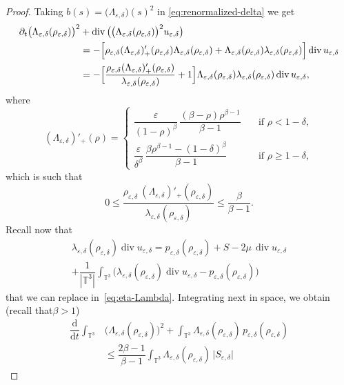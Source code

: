 \documentclass[JEP,XML,SOM,Unicode,NoEqCountersInSection]{cedram}
\newcommand{\<}{\bigl\langle}
\renewcommand{\>}{\bigr\rangle}
\newcommand{\labeleq}[1]{}
\theoremstyle{definition}
\theoremstyle{remark}
\newcommand{\TT}{\mathbb{T}^3}
\DeclareMathOperator{\Div}{div}
\newcommand{\Dt}{\dfrac{\mathrm{d}}{\mathrm{d} t}}
\let\ep\varepsilon
\begin{document}
\begin{proof}
Taking $b(s) = \big(\Lambda_{\ep,\delta}\big)(s)^2$ in \eqref{eq:renormalized-delta} we get
\begin{equation}\label{eq:eta-Lambda}
\begin{split}
\partial_t\big(\Lambda_{\ep,\delta}(\rho_{\ep,\delta})\big)^2& + \Div\big(\big(\Lambda_{\ep,\delta}(\rho_{\ep,\delta})\big)^2 u_{\ep,\delta} \big)\\
& = - \Big[\rho_{\ep,\delta} (\Lambda_{\ep,\delta})'_+(\rho_{\ep,\delta})\Lambda_{\ep,\delta}(\rho_{\ep,\delta})
+ \Lambda_{\ep,\delta}(\rho_{\ep,\delta}) \lambda_{\ep,\delta}(\rho_{\ep,\delta})
\Big] \Div u_{\ep,\delta} \\
& = - \Bigl[\frac{\rho_{\ep,\delta} (\Lambda_{\ep,\delta})'_+(\rho_{\ep,\delta})}{\lambda_{\ep,\delta}(\rho_{\ep,\delta})} + 1\Bigr]
\Lambda_{\ep,\delta}(\rho_{\ep,\delta})
\lambda_{\ep,\delta}(\rho_{\ep,\delta})\Div u_{\varepsilon, \delta},
\end{split}
\end{equation}
where
\[
(\Lambda_{\ep,\delta})'_+(\rho) =
\begin{cases}
\dfrac{\ep}{(1-\rho)^\beta}\, \dfrac{(\beta-\rho)\rho^{\beta-1}}{\beta-1} \quad&\text{if } \rho < 1-\delta, \\[10pt]
\dfrac{\ep}{\delta^\beta}\, \dfrac{\beta\rho^{\beta-1} - (1-\delta)^\beta}{\beta-1} \quad&\text{if } \rho \geq 1-\delta,
\end{cases}
\]
which is such that
\[
0 \leq \dfrac{\rho_{\ep,\delta} \ (\Lambda_{\ep,\delta})'_+(\rho_{\ep,\delta})}{\lambda_{\ep,\delta}(\rho_{\ep,\delta})}
\leq \dfrac{\beta}{\beta-1}.
\]
Recall now that
\begin{multline*}
\lambda_{\ep,\delta}(\rho_{\ep,\delta})\Div u_{\ep,\delta}
= p_{\ep,\delta} (\rho_{\ep,\delta})
+ S
- 2\mu \, \Div u_{\ep,\delta} \\
+ \dfrac{1}{|\TT|} \int_{\TT}{\big(\lambda_{\ep,\delta}(\rho_{\ep,\delta})\Div u_{\ep,\delta} - p_{\ep,\delta} (\rho_{\ep,\delta}) \big)}
\end{multline*}
that we can replace in~\eqref{eq:eta-Lambda}.
Integrating next in space, we obtain (recall that$\beta > 1$)
\begin{align*}\labeleq{eta-2}
\Dt \int_{\TT}&\big(\Lambda_{\ep,\delta}(\rho_{\ep,\delta})\big)^{2}
+ \int_{\TT}{\Lambda_{\ep,\delta}(\rho_{\ep,\delta})\, p_{\ep,\delta} (\rho_{\ep,\delta})} \\
& \le
\dfrac{2\beta -1}{\beta-1}\int_{\TT}{\Lambda_{\ep,\delta}(\rho_{\ep,\delta})\, |S_{\ep,\delta}}|

\end{align*}
\end{proof}
\end{document}
